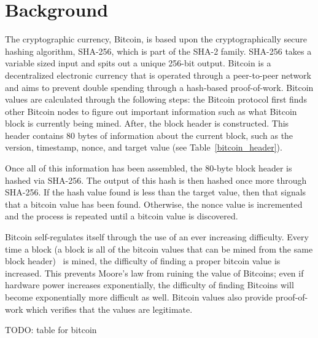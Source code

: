 \section{Background}

The cryptographic currency, Bitcoin, is based upon the cryptographically secure hashing algorithm, SHA-256, which is part of the SHA-2 family.
SHA-256 takes a variable sized input and spits out a unique 256-bit output.
Bitcoin is a decentralized electronic currency that is operated through a peer-to-peer network and aims to prevent double spending through a hash-based proof-of-work.
Bitcoin values are calculated through the following steps: the Bitcoin protocol first finds other Bitcoin nodes to figure out important information such as what Bitcoin block is currently being mined.
After, the block header is constructed.
This header contains 80 bytes of information about the current block, such as the version, timestamp, nonce, and target value (see Table~\ref{bitcoin_header}).

Once all of this information has been assembled, the 80-byte block header is hashed via SHA-256.
The output of this hash is then hashed once more through SHA-256.
If the hash value found is less than the target value, then that signals that a bitcoin value has been found.
Otherwise, the nonce value is incremented and the process is repeated until a bitcoin value is discovered.

Bitcoin self-regulates itself through the use of an ever increasing difficulty.
Every time a block (a block is all of the bitcoin values that can be mined from the same block header)  is mined, the difficulty of finding a proper bitcoin value is increased.
This prevents Moore’s law from ruining the value of Bitcoins; even if hardware power increases exponentially, the difficulty of finding Bitcoins will become exponentially more difficult as well.
Bitcoin values also provide proof-of-work which verifies that the values are legitimate.

\begin{table}
\label{bitcoin_header}
TODO: table for bitcoin
\end{table}


